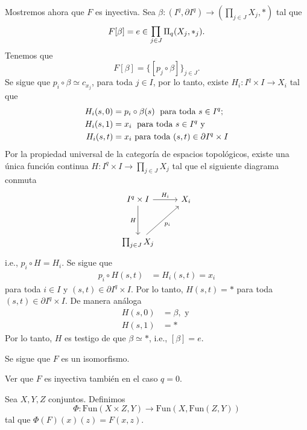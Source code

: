 \begin{dem}
    Mostremos ahora que $F$ es inyectiva. Sea $\beta:(I^q,\partial I^q)\to (\prod_{j\in J}X_j,*)$ tal que 
    \begin{equation*}
        F[\beta]=e\in\medprod_{j\in J}\Pi_q(X_j,*_j).
    \end{equation*}
    Tenemos que
    \begin{equation*}
        F[\beta]=\{[p_j\circ \beta]\}_{j\in J}.
    \end{equation*}
    Se sigue que $p_i\circ \beta\simeq c_{x_j}$, para toda $j\in I$, por lo tanto, existe $H_i:I^q\times I\to X_i$ tal que 
    \begin{align*}
        H_i(s,0)&=p_i\circ\beta (s) \text{ \;para toda } s\in I^q;\\
        H_i(s,1)&=x_i \text{\; para toda }s\in I^q\text{ y}\\
        H_i(s,t)&=x_i\text{ para toda } (s,t)\in\partial I^q\times I
    \end{align*}
    Por la propiedad universal de la categoría de espacios topológicos, existe una única función continua $H:I^q\times I\to \prod_{j\in J}X_j$ tal que el siguiente diagrama conmuta  
     \begin{equation*}
        \begin{tikzcd}[row sep= 1.2cm]
             I^q\times I\arrow[r,"H_{i}"] \arrow[d, "H"']& X_i\\
            \prod_{j\in J}X_j\arrow[ur, "p_i"']
        \end{tikzcd}
    \end{equation*}
    i.e., $p_i\circ H=H_{i}$. Se sigue que 
    \begin{align*}
        p_i \circ H(s,t)&=H_i(s,t)=x_i    
    \end{align*}
    para toda $i\in I$ y $(s,t)\in \partial I^q\times I$. Por lo tanto, $H(s,t)=*$ para toda $(s,t)\in \partial I^q\times I$. De manera análoga
    \begin{align*}
        H(s,0)&=\beta, \text{ y }\\
        H(s,1)&=*
    \end{align*}
    Por lo tanto, $H$ es testigo de que $\beta\simeq *$, i.e., $[\beta]=e$.

    Se sigue que $F$ es un isomorfismo.
\end{dem}
\begin{ejercicio}
    Ver que $F$ es inyectiva también en el caso $q=0$.
\end{ejercicio}
\begin{definicion}
    Sea $X,Y,Z$ conjuntos. Definimos
    \begin{equation*}
        \Phi:\text{Fun}(X\times Z,Y)\to\text{Fun}(X,\text{Fun}(Z,Y))
    \end{equation*}
    tal que $\Phi(F)(x)(z)=F(x,z)$.
\end{definicion}
